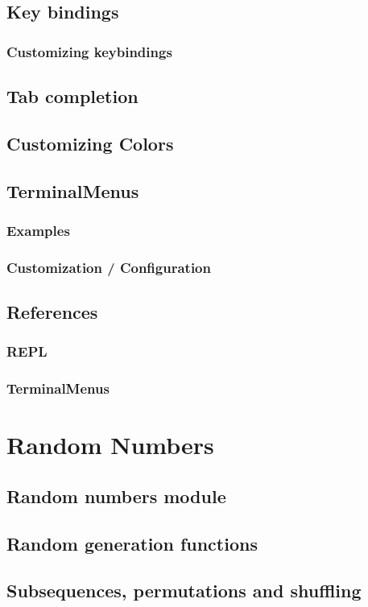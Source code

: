     \section{Key bindings}
    \subsection{Customizing keybindings}
    \section{Tab completion}
    \section{Customizing Colors}
    \section{TerminalMenus}
    \subsection{Examples}
    \subsection{Customization / Configuration}
    \section{References}
    \subsection{REPL}
    \subsection{TerminalMenus}
  \chapter{Random Numbers}
    \section{Random numbers module}
    \section{Random generation functions}
    \section{Subsequences, permutations and shuffling}
